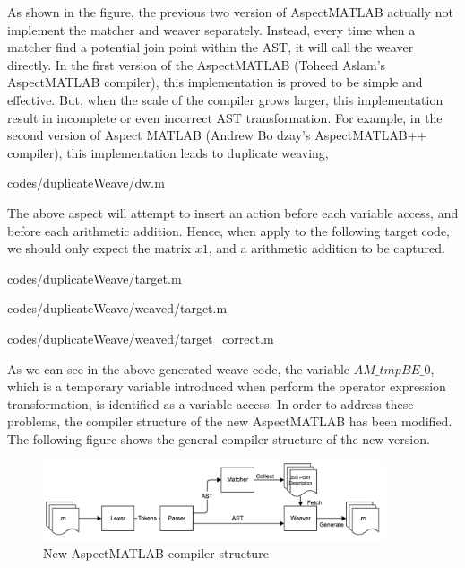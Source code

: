 \documentclass{comp621}
\begin{document}
As shown in the figure, the previous two version of AspectMATLAB actually not
implement the matcher and weaver separately. Instead, every time when a matcher
find a potential join point within the AST, it will call the weaver directly.
In the first version of the AspectMATLAB (Toheed Aslam's AspectMATLAB
compiler), this implementation is proved to be simple and effective. But, when
the scale of the compiler grows larger, this implementation result in
incomplete or even incorrect AST transformation. For example, in the second
version of Aspect MATLAB (Andrew Bo dzay's AspectMATLAB++ compiler), this
implementation leads to duplicate weaving,
\begin{multicols}{2}


                {codes/duplicateWeave/dw.m}

\end{multicols}

The above aspect will attempt to insert an action before each variable access,
and before each arithmetic addition. Hence, when apply to the following target
code, we should only expect the matrix $x1$, and a arithmetic addition to be
captured.



                {codes/duplicateWeave/target.m}
\begin{multicols}{2}

                {codes/duplicateWeave/weaved/target.m}
                
\columnbreak

                {codes/duplicateWeave/weaved/target_correct.m}
\end{multicols}

As we can see in the above generated weave code, the variable $AM\_tmpBE\_0$,
which is a temporary variable introduced when perform the operator expression
transformation, is identified as a variable access. In order to address these
problems, the compiler structure of the new AspectMATLAB has been modified. The
following figure shows the general compiler structure of the new version.

\begin{figure}[!htbp]
    \begin{center}
    \includegraphics[width=0.9\textwidth]{figures/new_compiler_strucutre}
    \end{center}
    \caption{New AspectMATLAB compiler structure}
\end{figure}
\end{document}
